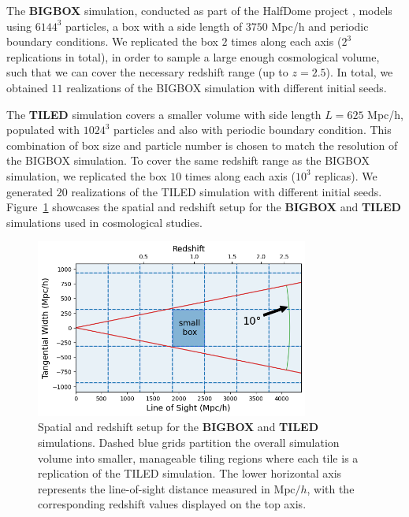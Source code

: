 The \textbf{BIGBOX} simulation, conducted as part of the HalfDome project \citep{2024arXiv240717462B}, models using $6144^3$ particles, a box with a side length of $3750$ Mpc/h and periodic boundary conditions. We replicated the box $2$ times along each axis ($2^3$ replications in total), in order to sample a large enough cosmological volume, such that we can cover the necessary redshift range (up to $z = 2.5$). In total, we obtained $11$ realizations of the BIGBOX simulation with different initial seeds.

The \textbf{TILED} simulation covers a smaller volume with side length $L = 625$ Mpc/h, populated with $1024^3$ particles and also with periodic boundary condition. This combination of box size and particle number is chosen to match the resolution of the BIGBOX simulation. To cover the same redshift range as the BIGBOX simulation, we replicated the box $10$ times along each axis ($10^3$ replicas). We generated $20$ realizations of the TILED simulation with different initial seeds. Figure~\ref{fig:simulationsetting} showcases the spatial and redshift setup for the \textbf{BIGBOX} and \textbf{TILED} simulations used in cosmological studies. 

\begin{figure}[ht]
    \centering
    \includegraphics[width=0.8\textwidth]{figures/light_cone_configuration.png}
    \caption{Spatial and redshift setup for the \textbf{BIGBOX} and \textbf{TILED} simulations. Dashed blue grids partition the overall simulation volume into smaller, manageable tiling regions where each tile is a replication of the TILED simulation. The lower horizontal axis represents the line-of-sight distance measured in $\mathrm{Mpc}/h$, with the corresponding redshift values displayed on the top axis.} \label{fig:simulationsetting}
\end{figure}

